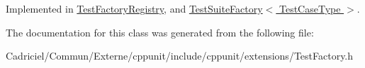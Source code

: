 Implemented in \hyperlink{class_test_factory_registry_a75fd01e6d565fb0f576ed1a887655089}{Test\+Factory\+Registry}, and \hyperlink{class_test_suite_factory_a0790b11de1543fa894acd7069fd1f327}{Test\+Suite\+Factory$<$ Test\+Case\+Type $>$}.



The documentation for this class was generated from the following file\+:\begin{DoxyCompactItemize}
\item 
Cadriciel/\+Commun/\+Externe/cppunit/include/cppunit/extensions/Test\+Factory.\+h\end{DoxyCompactItemize}
